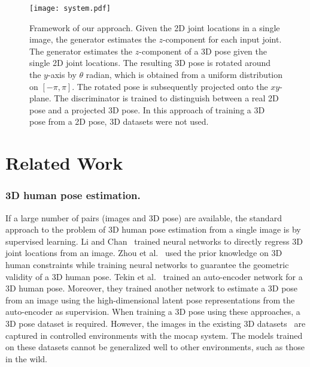 \documentclass[runningheads]{llncs}
\newcommand{\ogaki}[1]{\textbf{\textcolor{magenta}{[\textsc{OGAKI:} #1]}}}
\begin{document}
\begin{figure}[tb]
  \begin{center}
    \texttt{[image: system.pdf]}
    \caption{
Framework of our approach.
Given the 2D joint locations in a single image, the generator estimates the $z$-component for each input joint.
The generator estimates the $z$-component of a 3D pose given the single 2D joint locations. 
The resulting 3D pose is rotated around the $y$-axis by $\theta$ radian, which is obtained from a uniform distribution on $[-\pi, \pi]$.
The rotated pose is subsequently projected onto the $xy$-plane.
The discriminator is trained to distinguish between a real 2D pose and a projected 3D pose.
In this approach of training a 3D pose from a 2D pose, 3D datasets were not used.
}
    \label{system}
  \end{center}
\end{figure}

\section{Related Work}


\subsubsection{3D human pose estimation.}
If a large number of pairs (images and 3D pose) are available, the standard approach to the problem of 3D human pose estimation from a single image is by supervised learning.
Li and Chan~\cite{li20143dpose} trained neural networks to directly regress 3D joint locations from an image.
Zhou et al.~\cite{zhou2016deepkinematic} used the prior knowledge on 3D human constraints while training neural networks to guarantee the geometric validity of a 3D human pose.
Tekin et al.~\cite{tekin2016structured} trained an auto-encoder network for a 3D human pose.
Moreover, they trained another network to estimate a 3D pose from an image using the high-dimensional latent pose representations from the auto-encoder as supervision.
When training a 3D pose using these approaches, a 3D pose dataset is required.
However, the images in the existing 3D datasets~\cite{sigal2010humaneva,ionescu2014human3.6m,mpi-inf} are captured in controlled environments with the mocap system.
The models trained on these datasets cannot be generalized well to other environments, such as those in the wild.
\end{document}
